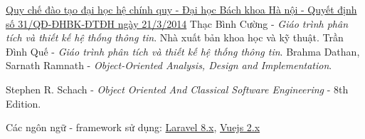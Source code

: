 \newpage

\begin{thebibliography}{9}
\thispagestyle{fancy}
     \href{https://google.com}{Quy chế đào tạo đại học hệ chính quy - Đại học Bách khoa Hà nội - Quyết định số 31/QĐ-ĐHBK-ĐTĐH ngày 21/3/2014}
    Thạc Bình Cường - \textit{Giáo trình phân tích và thiết kế hệ thống thông tin}. Nhà xuất bản khoa học và kỹ thuật.
    Trần Đình Quế - \textit{Giáo trình phân tích và thiết kế hệ thống thông tin}.
    Brahma Dathan, Sarnath Ramnath - \textit{Object-Oriented Analysis, Design and Implementation}.

    Stephen R. Schach - \textit{Object Oriented And Classical Software Engineering} - 8th Edition.
    
    Các ngôn ngữ - framework sử dụng:
    \href{https://laravel.com/docs/8.x}{Laravel 8.x}, 
    \href{https://v2.vuejs.org/v2/guide/}{Vuejs 2.x}

\end{thebibliography}
